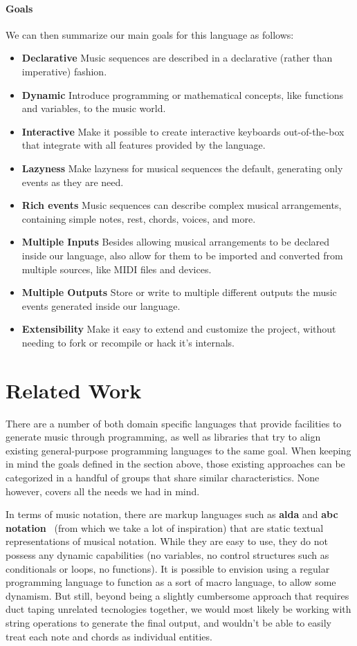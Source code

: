 \documentclass[a4paper,UKenglish,cleveref, autoref]{oasics-v2019}
\begin{document}
\paragraph*{Goals}
We can then summarize our main goals for this language as follows:
\begin{itemize}
 \item \textbf{Declarative} Music sequences are described in a declarative (rather than imperative) fashion.
 \item \textbf{Dynamic} Introduce programming or mathematical concepts, like functions and variables, to the music world.
 \item \textbf{Interactive} Make it possible to create interactive keyboards out-of-the-box that integrate with all features provided by the language.
 \item \textbf{Lazyness} Make lazyness for musical sequences the default, generating only events as they are need.
 \item \textbf{Rich events} Music sequences can describe complex musical arrangements, containing simple notes, rest, chords, voices, and more.
 \item \textbf{Multiple Inputs} Besides allowing musical arrangements to be declared inside our language, also allow for them to be imported and converted from multiple sources, like MIDI files and devices.
 \item \textbf{Multiple Outputs} Store or write to multiple different outputs the music events generated inside our language.
 \item \textbf{Extensibility} Make it easy to extend and customize the project, without needing to fork or recompile or hack it's internals.
\end{itemize}

\section{Related Work}
There are a number of both domain specific languages that provide facilities to generate music through programming, as well as libraries that try to align existing general-purpose programming languages to the same goal. When keeping in mind the goals defined in the section above, those existing approaches can be categorized in a handful of groups that share similar characteristics. None however, covers all the needs we had in mind.

In terms of music notation, there are markup languages such as \textbf{alda} and \textbf{abc notation}~\cite{AbcNotation} (from which we take a lot of inspiration) that are static textual representations of musical notation. While they are easy to use, they do not possess any dynamic capabilities (no variables, no control structures such as conditionals or loops, no functions). It is possible to envision using a regular programming language to function as a sort of macro language, to allow some dynamism. But still, beyond being a slightly cumbersome approach that requires duct taping unrelated tecnologies together, we would most likely be working with string operations to generate the final output, and wouldn't be able to easily treat each note and chords as individual entities.
\end{document}
